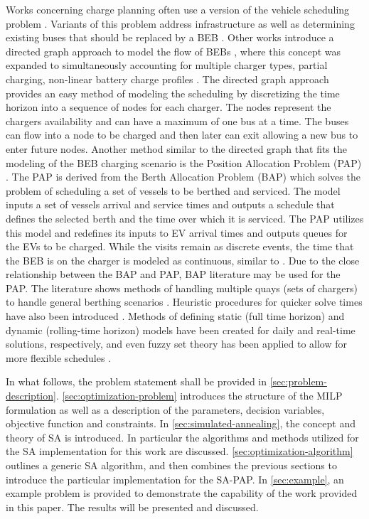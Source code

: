 \documentclass[11pt,a4paper,final]{article}
\begin{document}
Works concerning charge planning often use a version of the vehicle scheduling problem \cite{tang-2019-robus-sched,li-2014-trans-bus,he-2020-optim-charg}. Variants of this problem address infrastructure as well as determining
existing buses that should be replaced by a BEB \cite{zhou-2020-bi-objec,duan-2021-refor-mixed,rinaldi-2020-mixed-fleet,zhou-2020-collab-optim}. Other works introduce a directed graph approach to model the flow
of BEBs \cite{whitaker-2023-a-network,liu-2020-batter-elect}, where this concept was expanded to simultaneously
accounting for multiple charger types, partial charging, non-linear battery charge profiles
\cite{whitaker-2023-a-network}. The directed graph approach provides an easy method of modeling the scheduling by
discretizing the time horizon into a sequence of nodes for each charger. The nodes represent the chargers availability
and can have a maximum of one bus at a time. The buses can flow into a node to be charged and then later can exit
allowing a new bus to enter future nodes. Another method similar to the directed graph that fits the modeling of the BEB
charging scenario is the Position Allocation Problem (PAP) \cite{qarebagh-2019-optim-sched}. The PAP is derived from
the Berth Allocation Problem (BAP) which solves the problem of scheduling a set of vessels to be berthed and serviced.
The model inputs a set of vessels arrival and service times and outputs a schedule that defines the selected berth and
the time over which it is serviced. The PAP utilizes this model and redefines its inputs to EV arrival times and outputs
queues for the EVs to be charged. While the visits remain as discrete events, the time that the BEB is on the charger is
modeled as continuous, similar to \cite{frojan-2015-contin-berth,qarebagh-2019-optim-sched,zhou-2020-collab-optim}.
Due to the close relationship between the BAP and PAP, BAP literature may be used for the PAP. The literature shows
methods of handling multiple quays (sets of chargers) to handle general berthing scenarios
\cite{frojan-2015-contin-berth,dai-2008-suppl-chain-analy}. Heuristic procedures for quicker solve times have also
been introduced \cite{imai-2001-dynam-berth}. Methods of defining static (full time horizon) and dynamic (rolling-time
horizon) models have been created for daily and real-time solutions, respectively, and even fuzzy set theory has been
applied to allow for more flexible schedules
\cite{bello-2019-fuzzy-activ,dai-2008-suppl-chain-analy,buhrkal-2011-model-discr,frojan-2015-contin-berth}.

In what follows, the problem statement shall be provided in \ref{sec:problem-description}. \ref{sec:optimization-problem}
introduces the structure of the MILP formulation as well as a description of the parameters, decision variables,
objective function and constraints. In \ref{sec:simulated-annealing}, the concept and theory of SA is introduced. In
particular the algorithms and methods utilized for the SA implementation for this work are discussed.
\ref{sec:optimization-algorithm} outlines a generic SA algorithm, and then combines the previous sections to introduce the
particular implementation for the SA-PAP. In \ref{sec:example}, an example problem is provided to demonstrate the capability
of the work provided in this paper. The results will be presented and discussed.
\end{document}
